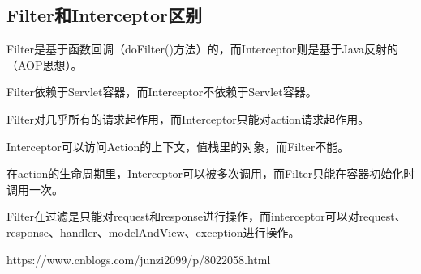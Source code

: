 \documentclass[../../../interview-questions.tex]{subfiles}
\begin{document}
\subsection{Filter和Interceptor区别}

Filter是基于函数回调（doFilter()方法）的，而Interceptor则是基于Java反射的（AOP思想）。

Filter依赖于Servlet容器，而Interceptor不依赖于Servlet容器。

Filter对几乎所有的请求起作用，而Interceptor只能对action请求起作用。

Interceptor可以访问Action的上下文，值栈里的对象，而Filter不能。

在action的生命周期里，Interceptor可以被多次调用，而Filter只能在容器初始化时调用一次。

Filter在过滤是只能对request和response进行操作，而interceptor可以对request、response、handler、modelAndView、exception进行操作。

https://www.cnblogs.com/junzi2099/p/8022058.html
\end{document}
